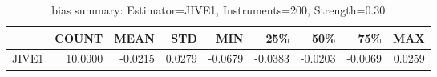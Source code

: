\begin{table}[ht]
\centering
\caption{bias summary: Estimator=JIVE1, Instruments=200, Strength=0.30}
\begin{tabular}{lrrrrrrrr}
\toprule
 & COUNT & MEAN & STD & MIN & 25\% & 50\% & 75\% & MAX \\
\midrule
JIVE1 & 10.0000 & -0.0215 & 0.0279 & -0.0679 & -0.0383 & -0.0203 & -0.0069 & 0.0259 \\
\bottomrule
\end{tabular}
\end{table}
